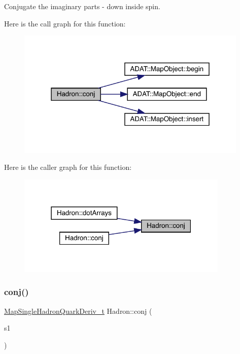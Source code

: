 Conjugate the imaginary parts -\/ down inside spin. 

Here is the call graph for this function\+:
\nopagebreak
\begin{figure}[H]
\begin{center}
\leavevmode
\includegraphics[width=313pt]{d1/daf/namespaceHadron_a5b62c8e194d4e04483d980199eff43fa_cgraph}
\end{center}
\end{figure}
Here is the caller graph for this function\+:
\nopagebreak
\begin{figure}[H]
\begin{center}
\leavevmode
\includegraphics[width=286pt]{d1/daf/namespaceHadron_a5b62c8e194d4e04483d980199eff43fa_icgraph}
\end{center}
\end{figure}
\mbox{\label{namespaceHadron_a218b77b239d871def6267d4b34bdf7c1}} 
\subsubsection{\texorpdfstring{conj()}{conj()}\hspace{0.1cm}{\footnotesize\ttfamily [2/3]}}
{\footnotesize\ttfamily \mbox{\hyperlink{namespaceHadron_aa588220689caea8a6aad4d0296526e6b}{Map\+Single\+Hadron\+Quark\+Deriv\+\_\+t}} Hadron\+::conj (\begin{DoxyParamCaption}\item[{const \mbox{\hyperlink{namespaceHadron_aa588220689caea8a6aad4d0296526e6b}{Map\+Single\+Hadron\+Quark\+Deriv\+\_\+t}} \&}]{s1 }\end{DoxyParamCaption})}



